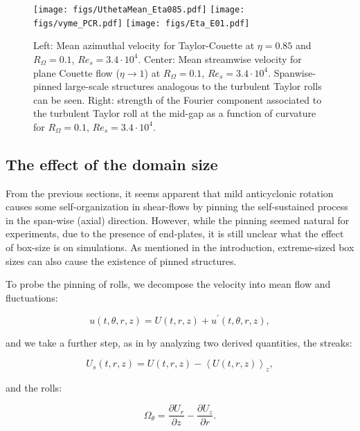 \documentclass{jfm}
\begin{document}
\begin{figure}
\texttt{[image: figs/UthetaMean\_Eta085.pdf]}
\texttt{[image: figs/vyme\_PCR.pdf]}
\texttt{[image: figs/Eta\_E01.pdf]}
\centering
\caption{Left: Mean azimuthal velocity for Taylor-Couette at $\eta=0.85$ and $R_\Omega=0.1$, $Re_s=3.4\cdot10^4$. Center: Mean streamwise velocity for plane Couette flow ($\eta \to 1$) at $R_\Omega=0.1$, $Re_s=3.4\cdot10^4$. Spanwise-pinned large-scale structures analogous to the turbulent Taylor rolls can be seen. Right: strength of the Fourier component associated to the turbulent Taylor roll at the mid-gap as a function of curvature for $R_\Omega=0.1$, $Re_s=3.4\cdot10^4$.} 
\label{fi:etatoone} 
\end{figure}

\subsection{The effect of the domain size}

From the previous sections, it seems apparent that mild anticyclonic rotation causes some self-organization in shear-flows by pinning the self-sustained process in the span-wise (axial) direction. However, while the pinning seemed natural for experiments, due to the presence of end-plates, it is still unclear what the effect of box-size is on simulations. As mentioned in the introduction, extreme-sized box sizes can also cause the existence of pinned structures. 

To probe the pinning of rolls, we decompose the velocity into mean flow and fluctuations:

\begin{equation}
u(t,\theta,r,z)=U(t,r,z) + u^{'}(t,\theta,r,z),
\end{equation}

\noindent and we take a further step, as in \cite{MoserMoin87} by analyzing two derived quantities, the streaks: 

\begin{equation}
U_s(t,r,z) = U(t,r,z) - \left\langle U(t,r,z) \right\rangle_{z},
\end{equation}

\noindent and the rolls: 

\begin{equation}
\Omega_{\theta} = \frac{\partial U_r}{\partial z} -\frac{\partial U_z}{\partial r}.
\end{equation}
\end{document}
